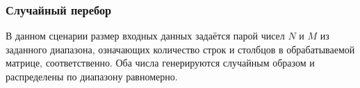 \subsubsection{Случайный перебор}
\label{random-exploration}

В данном сценарии размер входных данных задаётся парой чисел $N$ и $M$ из заданного диапазона, означающих количество строк и столбцов в обрабатываемой матрице, соответственно. Оба числа генерируются случайным образом и распределены по диапазону равномерно.

